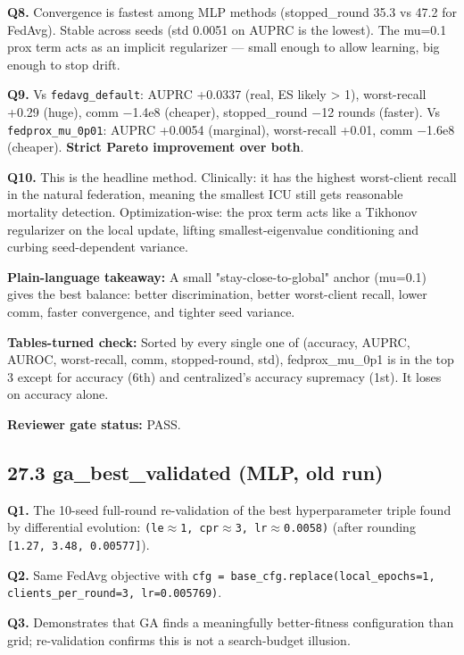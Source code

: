 \documentclass{article}
\begin{document}
\textbf{Q8.} Convergence is fastest among MLP methods (stopped\_round 35.3 vs 47.2 for FedAvg). Stable across seeds (std 0.0051 on AUPRC is the lowest). The mu=0.1 prox term acts as an implicit regularizer --- small enough to allow learning, big enough to stop drift.


\textbf{Q9.} Vs \texttt{fedavg\_default}: AUPRC +0.0337 (real, ES likely > 1), worst-recall +0.29 (huge), comm \ensuremath{-}1.4e8 (cheaper), stopped\_round \ensuremath{-}12 rounds (faster). Vs \texttt{fedprox\_mu\_0p01}: AUPRC +0.0054 (marginal), worst-recall +0.01, comm \ensuremath{-}1.6e8 (cheaper). \textbf{Strict Pareto improvement over both}.


\textbf{Q10.} This is the headline method. Clinically: it has the highest worst-client recall in the natural federation, meaning the smallest ICU still gets reasonable mortality detection. Optimization-wise: the prox term acts like a Tikhonov regularizer on the local update, lifting smallest-eigenvalue conditioning and curbing seed-dependent variance.


\textbf{Plain-language takeaway:} A small "stay-close-to-global" anchor (mu=0.1) gives the best balance: better discrimination, better worst-client recall, lower comm, faster convergence, and tighter seed variance.


\textbf{Tables-turned check:} Sorted by every single one of (accuracy, AUPRC, AUROC, worst-recall, comm, stopped-round, std), fedprox\_mu\_0p1 is in the top 3 except for accuracy (6th) and centralized's accuracy supremacy (1st). It loses on accuracy alone.


\textbf{Reviewer gate status:} PASS.


\subsection{27.3 ga\_best\_validated (MLP, old run)}


\textbf{Q1.} The 10-seed full-round re-validation of the best hyperparameter triple found by differential evolution: \texttt{(le\ensuremath{\approx}1, cpr\ensuremath{\approx}3, lr\ensuremath{\approx}0.0058)} (after rounding \texttt{[1.27, 3.48, 0.00577]}).


\textbf{Q2.} Same FedAvg objective with \texttt{cfg = base\_cfg.replace(local\_epochs=1, clients\_per\_round=3, lr=0.005769)}.


\textbf{Q3.} Demonstrates that GA finds a meaningfully better-fitness configuration than grid; re-validation confirms this is not a search-budget illusion.
\end{document}
